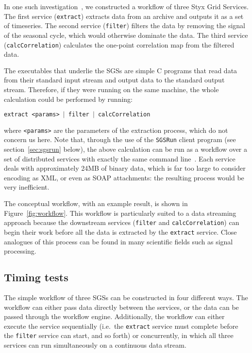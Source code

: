 \documentclass[a4paper]{article}
\begin{document}
In one such investigation~\cite{haines:2006}, we constructed a workflow of three Styx Grid Services.  The first service (\texttt{extract}) extracts data from an archive and outputs it as a set of timeseries.  The second service (\texttt{filter}) filters the data by removing the signal of the seasonal cycle, which would otherwise dominate the data.  The third service (\texttt{calcCorrelation}) calculates the one-point correlation map from the filtered data.

The executables that underlie the SGSs are simple C programs that read data from their standard input stream and output data to the standard output stream.  Therefore, if they were running on the same machine, the whole calculation could be performed by running:

\texttt{extract <params> $|$ filter $|$ calcCorrelation}

\noindent where \texttt{<params>} are the parameters of the extraction process, which do not concern us here.  Note that, through the use of the \texttt{SGSRun} client program (see section~\ref{sec:sgsrun} below), the above calculation can be run as a workflow over a set of distributed services with exactly the same command line~\cite{blower_lncs:2006}.  Each service deals with approximately 24MB of binary data, which is far too large to consider encoding as XML, or even as SOAP attachments: the resulting process would be very inefficient.

The conceptual workflow, with an example result, is shown in Figure~\ref{fig:workflow}.  This workflow is particularly suited to a data streaming approach because the downstream services (\texttt{filter} and \texttt{calcCorrelation}) can begin their work before all the data is extracted by the \texttt{extract} service.  Close analogues of this process can be found in many scientific fields such as signal processing.

\subsection{Timing tests}
The simple workflow of three SGSs can be constructed in four different ways.  The workflow can either pass data directly between the services, or the data can be passed through the workflow engine.  Additionally, the workflow can either execute the service sequentially (i.e.\ the \texttt{extract} service must complete before the \texttt{filter} service can start, and so forth) or concurrently, in which all three services can run simultaneously on a continuous data stream.
\end{document}
